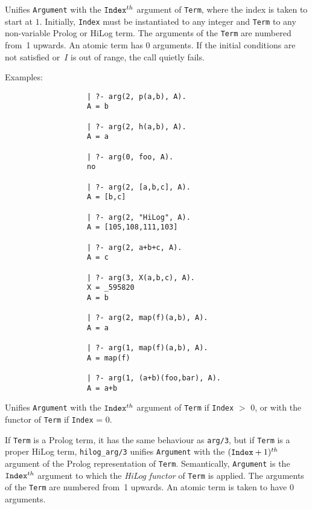 \begin{description}
    Unifies {\tt Argument} with the ${\tt Index}^{th}$ argument of 
    {\tt Term}\@, where the index is taken to start at $1$.
    Initially, {\tt Index} must be instantiated to any integer and {\tt Term} 
    to any non-variable Prolog or HiLog term.
    The arguments of the {\tt Term} are numbered from~1 upwards. An atomic term
    has $0$ arguments. If the initial conditions are not satisfied or~$I$ is 
    out of range, the call quietly fails.

    Examples:
    {\footnotesize
     \begin{verbatim}
                   | ?- arg(2, p(a,b), A).
                   A = b

                   | ?- arg(2, h(a,b), A).
                   A = a

                   | ?- arg(0, foo, A).
                   no

                   | ?- arg(2, [a,b,c], A).
                   A = [b,c]

                   | ?- arg(2, "HiLog", A).
                   A = [105,108,111,103]

                   | ?- arg(2, a+b+c, A).
                   A = c

                   | ?- arg(3, X(a,b,c), A).
                   X = _595820 
                   A = b 

                   | ?- arg(2, map(f)(a,b), A).
                   A = a

                   | ?- arg(1, map(f)(a,b), A). 
                   A = map(f)

                   | ?- arg(1, (a+b)(foo,bar), A).
                   A = a+b
     \end{verbatim}}

    Unifies {\tt Argument} with the ${\tt Index}^{th}$ argument of {\tt Term}
    if {\tt Index} $>$ 0, or with the functor of {\tt Term} if {\tt Index} = 0.

    If {\tt Term} is a Prolog term, it has the same behaviour as {\tt arg/3},
    but if {\tt Term} is a proper HiLog term, {\tt hilog\_arg/3} unifies 
    {\tt Argument} with the 
    $({\tt Index}+1)^{th}$ argument of the Prolog representation of 
    {\tt Term}\@.  Semantically, {\tt Argument} is the ${\tt Index}^{th}$ 
    argument to which the {\em HiLog functor} of {\tt Term} is applied.
    The arguments of the {\tt Term} are numbered from~1 upwards. An atomic term 
    is taken to have $0$ arguments.  
    

\end{description}
